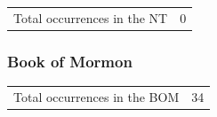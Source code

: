 	
			\begin{tabular}{ll}
				Total occurrences in the NT & 0
			\end{tabular}
			
			
		
			
				
		
	\subsubsection{Book of Mormon} %
		\label{FAVOR-BOM}
	
		\begin{tabular}{ll}
			Total occurrences in the BOM & 34
		\end{tabular}
		
		\begin{compactdesc}
			\item[]
		\end{compactdesc}
		
